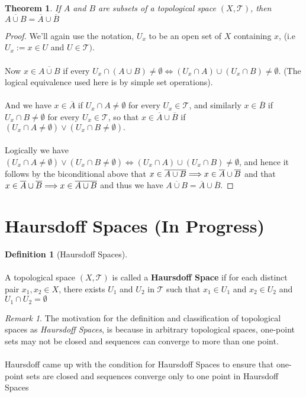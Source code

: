 \documentclass{article}
\newtheorem{theorem}{Theorem}[section]
\theoremstyle{remark}
\newtheorem*{remark}{Remark}
\theoremstyle{definition}
\newtheorem{definition}{Definition}[section]
\newcommand{\simplies}{\DOTSB\Longrightarrow}
\begin{document}
\medskip

\begin{theorem}
If $A$ and $B$ are subsets of a topological space $(X, \mathcal{T})$, then $\overline{A \cup B} = \overline{A} \cup \overline{B}$
\end{theorem}

\begin{proof}
We'll again use the notation, $U_x$ to be an open set of $X$ containing $x$, (i.e $U_x := x \in U$ and $U \in \mathcal{T})$. \\ \\Now $x \in \overline{A \cup B}$ if every $U_x \cap (A \cup B) \neq \emptyset \iff (U_x \cap A) \cup (U_x \cap B) \neq \emptyset$. (The logical equivalence used here is by simple set operations).
\\ \\
And we have $x \in \overline{A}$ if $U_x \cap A \neq \emptyset$ for every $U_x \in \mathcal{T}$, and similarly  $x \in \overline{B}$ if $U_x \cap B \neq \emptyset$ for every $U_x \in \mathcal{T}$, so that $x \in \overline{A} \cup \overline{B}$ if $(U_x \cap A \neq \emptyset) \lor (U_x \cap B \neq \emptyset).$
\\ \\
Logically we have $(U_x \cap A \neq \emptyset) \lor (U_x \cap B \neq \emptyset) \iff (U_x \cap A) \cup (U_x \cap B) \neq \emptyset$, and hence it follows by the biconditional  above that $x \in \overline{A \cup B} \simplies  x \in \overline{A} \cup \overline{B}$ and that $x \in \overline{A} \cup \overline{B} \simplies x \in \overline{A \cup B}$ and thus we have $\overline{A \cup B} = \overline{A} \cup \overline{B}$.
\end{proof}

\newpage

\section{Haursdoff Spaces (In Progress)}
\bigskip
\begin{definition}[Haursdoff Spaces]
\\ \\
A topological space $(X, \mathcal{T})$ is called a \textbf{Haursdoff Space} if for each distinct pair $x_1, x_2 \in X$, there exists $U_1$ and $U_2$ in $\mathcal{T}$ such that $x_1 \in U_1$ and $x_2 \in U_2$ and $U_1 \cap U_2 = \emptyset$
\end{definition}
\medskip
\begin{remark}
The motivation for the definition and classification of topological spaces as \textit{Haursdoff Spaces}, is because in arbitrary topological spaces, one-point sets may not be closed and sequences can converge to more than one point. 
\\ \\
Haursdoff came up with the condition for Haursdoff Spaces to ensure that one-point sets are closed and sequences converge only to one point in Haursdoff Spaces
\end{remark}
\end{document}

